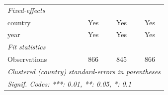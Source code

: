 \begin{table}[htbp]
\begin{tabular}{lccc}
      \midrule
      \emph{Fixed-effects}\\
      country              & Yes            & Yes                  & Yes\\  
      year                 & Yes            & Yes                  & Yes\\  
      \midrule
      \emph{Fit statistics}\\
      Observations         & 866            & 845                  & 866\\  
      \midrule \midrule
      \multicolumn{4}{l}{\emph{Clustered (country) standard-errors in parentheses}}\\
      \multicolumn{4}{l}{\emph{Signif. Codes: ***: 0.01, **: 0.05, *: 0.1}}\\
   \end{tabular}
\end{table}
